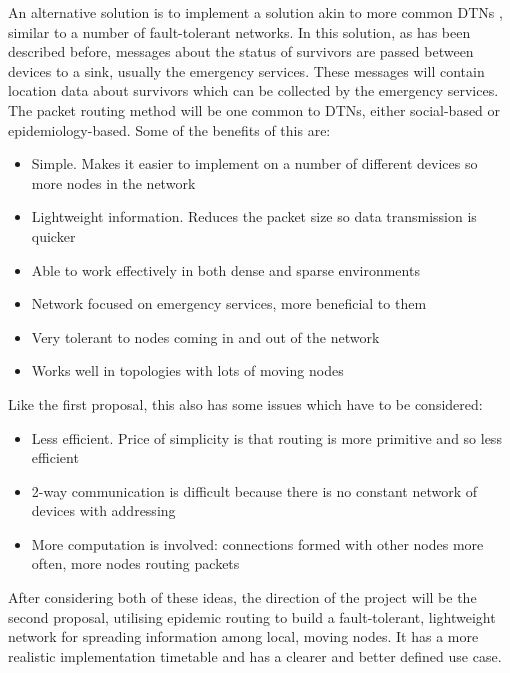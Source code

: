 \documentclass{report}
\begin{document}
An alternative solution is to implement a solution akin to more common DTNs \cite{choksatid2016efficient, wu2011emergency, zhu2012survey, zhu2013relative}, similar to a number of fault-tolerant networks. In this solution, as has been described before, messages about the status of survivors are passed between devices to a sink, usually the emergency services. These messages will contain location data about survivors which can be collected by the emergency services. The packet routing method will be one common to DTNs, either social-based or epidemiology-based. Some of the benefits of this are:
\begin{itemize}
    \item Simple. Makes it easier to implement on a number of different devices so more nodes in the network
    \item Lightweight information. Reduces the packet size so data transmission is quicker
    \item Able to work effectively in both dense and sparse environments
    \item Network focused on emergency services, more beneficial to them
    \item Very tolerant to nodes coming in and out of the network
    \item Works well in topologies with lots of moving nodes
\end{itemize}
Like the first proposal, this also has some issues which have to be considered:
\begin{itemize}
    \item Less efficient. Price of simplicity is that routing is more primitive and so less efficient
    \item 2-way communication is difficult because there is no constant network of devices with addressing
    \item More computation is involved: connections formed with other nodes more often, more nodes routing packets
\end{itemize}
After considering both of these ideas, the direction of the project will be the second proposal, utilising epidemic routing to build a fault-tolerant, lightweight network for spreading information among local, moving nodes. It has a more realistic implementation timetable and has a clearer and better defined use case.  
\end{document}
